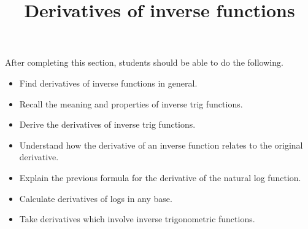 \documentclass{ximera}
\title{Derivatives of inverse functions}
\begin{document}
\begin{abstract}
\end{abstract}

\maketitle

\begin{sectionOutcomes}

After completing this section, students should be able to do the following.

\begin{itemize}
	\item Find derivatives of inverse functions in general.
	\item Recall the meaning and properties of inverse trig functions.
	\item Derive the derivatives of inverse trig functions.
	\item Understand how the derivative of an inverse function relates to the original derivative.
	\item Explain the previous formula for the derivative of the natural log function.
	\item Calculate derivatives of logs in any base.
	\item Take derivatives which involve inverse trigonometric functions.
\end{itemize}

\end{sectionOutcomes}
\end{document}
